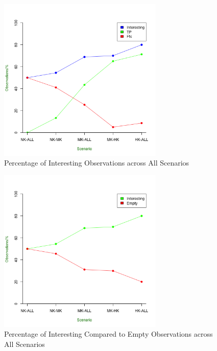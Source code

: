 	\begin{figure}[ht!]
	\centering
	\includegraphics[width=0.7\textwidth]{Chap7/figures/saturated/all_int_percent}
	\caption{Percentage of Interesting Observations across All Scenarios}
	\label{fig:sat:int:percent}
	\end{figure}

	\begin{figure}[ht!]
	\centering
	\includegraphics[width=0.7\textwidth]{Chap7/figures/saturated/all_int_empt}
	\caption{Percentage of Interesting Compared to Empty Observations across All Scenarios}
	\label{fig:sat:int:empty}
	\end{figure}

